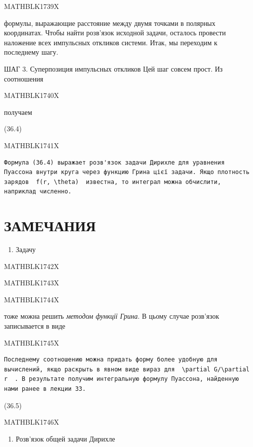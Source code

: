 \documentclass[
  ukrainian,
]{article}
\providecommand{\tightlist}{%
  \setlength{\itemsep}{0pt}\setlength{\parskip}{0pt}}
\begin{document}
MATHBLK1739X

формулы, выражающие расстояние между двумя точками в полярных
координатах. Чтобы найти розв'язок исходной задачи, осталось провести
наложение всех импульсных откликов системи. Итак, мы переходим к
последнему шагу.

ШАГ 3. Суперпозиция импульсных откликов Цей шаг совсем прост. Из
соотношения

MATHBLK1740X

получаем

(36.4)

MATHBLK1741X

\begin{verbatim}
Формула (36.4) выражает розв'язок задачи Дирихле для уравнения Пуассона внутри круга через функцию Грина цієї задачи. Якщо плотность зарядов  f(r, \theta)  известна, то интеграл можна обчислити, наприклад численно.
\end{verbatim}

\section{ЗАМЕЧАНИЯ}\label{ux437ux430ux43cux435ux447ux430ux43dux438ux44f-8}

\begin{enumerate}
\def\labelenumi{\arabic{enumi}.}
\tightlist
\item
  Задачу
\end{enumerate}

MATHBLK1742X

MATHBLK1743X

MATHBLK1744X

тоже можна решить \emph{методом функції Грина}. В цьому случае розв'язок
записывается в виде

MATHBLK1745X

\begin{verbatim}
Последнему соотношению можна придать форму более удобную для вычислений, якщо раскрыть в явном виде вираз для  \partial G/\partial r  . В результате получим интегральную формулу Пуассона, найденную нами ранее в лекции 33.
\end{verbatim}

(36.5)

MATHBLK1746X

\begin{enumerate}
\def\labelenumi{\arabic{enumi}.}
\setcounter{enumi}{1}
\tightlist
\item
  Розв'язок общей задачи Дирихле
\end{enumerate}
\end{document}
